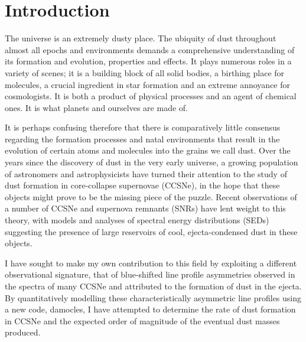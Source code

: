 \chapter{Introduction}\label{chp:chp1}

%
%



The universe is an extremely dusty place.  The ubiquity of dust throughout almost all epochs and environments demands a comprehensive understanding of its formation and evolution, properties and effects.  It plays numerous roles in a variety of scenes; it is a building block of  all solid bodies, a birthing place for molecules, a crucial ingredient in star formation and an extreme annoyance for cosmologists.  It is both a product of physical processes and an agent of chemical ones. It is what planets and ourselves are made of.

It is perhaps confusing therefore that there is comparatively little consensus regarding the formation processes and natal environments that result in the evolution of certain atoms and molecules into the grains we call dust.  Over the years since the  discovery  of dust in the very early universe, a growing population of astronomers and astrophysicists have turned their attention to the study of dust formation in core-collapse supernovae (CCSNe), in the hope that these objects might prove to be the missing piece of the puzzle.  Recent observations of a number of CCSNe and supernova remnants (SNRs) have lent weight to this theory, with models and analyses of spectral energy distributions (SEDs)  suggesting the presence of large reservoirs of cool, ejecta-condensed dust in these objects. 

I have sought to make my own contribution to this field by exploiting a different observational signature, that of  blue-shifted line profile asymmetries observed in the spectra of many CCSNe and attributed to the formation of dust in the ejecta.  By quantitatively modelling these characteristically asymmetric line profiles using a new code, {\sc damocles}, I have attempted to determine the rate of dust formation in CCSNe and the expected order of magnitude of the eventual dust masses produced.

